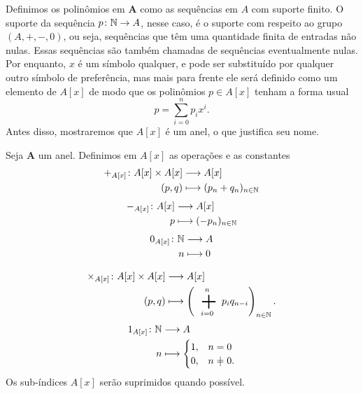 Definimos os polinômios em $\bm A$ como as sequências em $A$ com suporte finito. O suporte da sequência $p\colon \mathbb{N} \to A$, nesse caso, é o suporte com respeito ao grupo $(A,+,-,0)$, ou seja, sequências que têm uma quantidade finita de entradas não nulas. Essas sequências são também chamadas de sequências eventualmente nulas. Por enquanto, $x$ é um símbolo qualquer, e pode ser substituído por qualquer outro símbolo de preferência, mas mais para frente ele será definido como um elemento de $A[x]$ de modo que os polinômios $p \in A[x]$ tenham a forma usual
	\begin{equation*}
	p = \sum_{i=0}^{n} p_i x^i.
	\end{equation*}
Antes disso, mostraremos que $A[x]$ é um anel, o que justifica seu nome.

\begin{definition}
Seja $\bm A$ um anel. Definimos em $A[x]$ as operações e as constantes
	\begin{align*}
	{+_{A[x]}}\colon {A[x] \times A[x]} &\longrightarrow {A[x]} \\{(p,q)} &\longmapsto (p_n+q_n)_{n \in \mathbb{N}}
	\end{align*}
	\begin{align*}
	{-_{A[x]}}\colon {A[x]} &\longrightarrow {A[x]} \\{p} &\longmapsto (-p_n)_{n \in \mathbb{N}}
	\end{align*}
	\begin{align*}
	{0_{A[x]}}\colon {\mathbb{N}} &\longrightarrow {A} \\{n} &\longmapsto 0
	\end{align*}

	\begin{align*}
	\func{\times_{A[x]}}{A[x] \times A[x]}{A[x]}{(p,q)}{\left(\sum_{i=0}^n p_i q_{n-i}\right)_{n \in \N}}.
	\end{align*}
	\begin{align*}
	\func{1_{A[x]}}{\N}{A}{n}{\begin{cases}
		1,& n=0 \\
		0,& n\neq0.
	\end{cases}}
	\end{align*}
Os sub-índices $A[x]$ serão suprimidos quando possível.
\end{definition}

